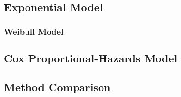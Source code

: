 \subsection{Exponential Model}
\label{additional:Survival:exp}

\subsubsection{Weibull Model}
\label{additional:Survival:weibull}

\subsection{Cox Proportional-Hazards Model}
\label{additional:Survival:cox}

\subsection{Method Comparison}
\label{additional:Survival:comp}

